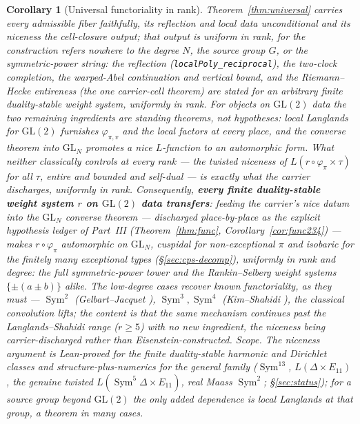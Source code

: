 \documentclass[11pt]{article}
\newtheorem{corollary}[theorem]{Corollary}
\theoremstyle{definition}
\newcommand{\Sym}{\operatorname{Sym}}
\begin{document}
\begin{corollary}[Universal functoriality in rank]\label{cor:universal}
Theorem~\ref{thm:universal} carries every admissible fiber faithfully, its reflection and local data
unconditional and its niceness the cell-closure output; that output is uniform in rank, for the
construction refers nowhere to the degree $N$, the source group $G$, or the symmetric-power string: the
reflection (\texttt{localPoly\_reciprocal}), the two-clock completion, the warped-Abel continuation and vertical
bound, and the Riemann--Hecke entireness (the one carrier-cell theorem) are stated for an \emph{arbitrary} finite
duality-stable weight system, \emph{uniformly in rank}. For objects on $\mathrm{GL}(2)$ data the two remaining
ingredients are standing theorems, not hypotheses: local Langlands for $\mathrm{GL}(2)$ furnishes
$\varphi_{\pi,v}$ and the local factors at every place, and the converse theorem into $\mathrm{GL}_N$ \cite{CPS}
promotes a nice $L$-function to an automorphic form. What neither classically controls at every rank --- the
twisted niceness of $L(r\circ\varphi_\pi\times\tau)$ for all $\tau$, entire and bounded and self-dual --- is
exactly what the carrier discharges, uniformly in rank. Consequently, \textbf{every finite duality-stable weight
system $r$ on $\mathrm{GL}(2)$ data transfers}: feeding the carrier's nice datum into the $\mathrm{GL}_N$ converse
theorem --- discharged place-by-place as the explicit hypothesis ledger of Part~III (Theorem~\ref{thm:func},
Corollary~\ref{cor:func234}) --- makes $r\circ\varphi_\pi$ automorphic on $\mathrm{GL}_N$, cuspidal for
non-exceptional $\pi$ and isobaric for the finitely many exceptional types (\S\ref{sec:cps-decomp}), uniformly in
rank and degree: the full symmetric-power tower and the Rankin--Selberg weight systems $\{\pm(a\pm b)\}$ alike. The low-degree cases recover known functoriality, as they
must --- $\Sym^2$ (Gelbart--Jacquet \cite{GJ}), $\Sym^3,\Sym^4$ (Kim--Shahidi \cite{KimShahidi}), the classical
convolution lifts; the content is that the \emph{same} mechanism continues past the Langlands--Shahidi range
($r\ge5$) with no new ingredient, the niceness being carrier-discharged rather than Eisenstein-constructed.
\emph{Scope.} The niceness argument is Lean-proved for the finite duality-stable harmonic and Dirichlet classes
and structure-plus-numerics for the general family ($\Sym^{13}$, $L(\Delta\times E_{11})$, the genuine twisted $L(\Sym^5\Delta\times E_{11})$, real Maass $\Sym^2$;
\S\ref{sec:status}); for a source group beyond $\mathrm{GL}(2)$ the only added dependence is local Langlands at
that group, a theorem in many cases.
\end{corollary}
\end{document}
